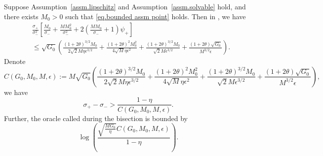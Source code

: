 \documentclass{mcom-l}
\numberwithin{equation}{section}
\begin{document}
\begin{lemma}
    \label{coro.bisection bound}
    Suppose Assumption~\ref{assm.lipschitz} and Assumption~\ref{assm.solvable} hold, and there exists $M_0>0$ such that \eqref{eq.bounded assm point} holds. Then in , we have
    \begin{equation*}
        \begin{aligned}
             & \frac{\sigma_+}{\sigma_-^2}\left[\frac{M_0}{\sigma_-}+\frac{MM_0^2}{\sigma_-^2}+2\left(\frac{MM_0}{\sigma_-}+1\right)\psi_+
            \right]                                                                                                                                                                                                                                          \\
             & \leq \sqrt{G_0}\left(\frac{(1+2\theta)^{3/2}M_0}{2\sqrt{2}M\eta \epsilon^{3/2}}+\frac{(1+2\theta)^2M_0^2}{4\sqrt{M}\eta\epsilon^2}+\frac{(1+2\theta)^{3/2}M_0}{\sqrt{2}M\epsilon^{3/2}}+\frac{(1+2\theta)\sqrt{G_0}}{M^{3/2}\epsilon}\right).
        \end{aligned}
    \end{equation*}
    Denote
    $$C(G_0,M_0,M,\epsilon):= M\sqrt{G_0}\left(\frac{(1+2\theta)^{3/2}M_0}{2\sqrt{2}M\eta \epsilon^{3/2}}+\frac{(1+2\theta)^2M_0^2}{4\sqrt{M}\eta\epsilon^2}+\frac{(1+2\theta)^{3/2}M_0}{\sqrt{2}M\epsilon^{3/2}}+\frac{(1+2\theta)\sqrt{G_0}}{M^{3/2}\epsilon}\right),$$
    we have
    \begin{equation}
        \label{eq.bound value by brackets}
        \sigma_+-\sigma_->\frac{1-\eta}{C(G_0,M_0,M,\epsilon)}.
    \end{equation}
    Further, the oracle called during the bisection is bounded by
    \begin{equation*}
        \log \left(\frac{\sqrt{\frac{MG_0}{\eta}}C(G_0,M_0,M,\epsilon)}{1-\eta}\right).
    \end{equation*}
\end{lemma}
\end{document}
